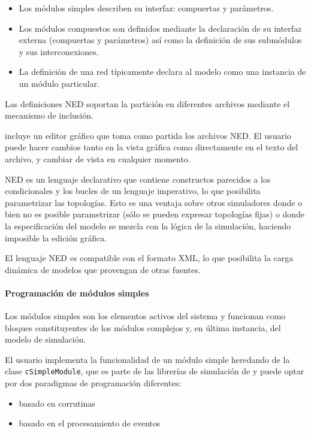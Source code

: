 \begin{itemize}
    \item Los módulos simples describen su interfaz: compuertas y parámetros.

    \item Los módulos compuestos son definidos mediante la declaración de su
interfaz externa (compuertas y parámetros) así como la definición de sus
submódulos y sus interconexiones.

    \item La definición de una red típicamente declara al modelo como una
instancia de un módulo particular.
\end{itemize}

Las definiciones NED soportan la partición en diferentes archivos mediante el
mecanismo de inclusión.

\omnetpp{} incluye un editor gráfico que toma como partida los archivos NED. El
usuario puede hacer cambios tanto en la vista gráfica como directamente en el
texto del archivo, y cambiar de vista en cualquier momento.

NED es un lenguaje declarativo que contiene constructos parecidos a los
condicionales y los bucles de un lenguaje imperativo, lo que posibilita
parametrizar las topologías. Esto es una ventaja sobre otros simuladores donde
o bien no es posible parametrizar (sólo se pueden expresar topologías fijas) o
donde la especificación del modelo se mezcla con la lógica de la simulación,
haciendo imposible la edición gráfica.

El lenguaje NED es compatible con el formato XML, lo que posibilita la carga
dinámica de modelos que provengan de otras fuentes.

\paragraph{Programación de módulos simples}

Los módulos simples son los elementos activos del sistema y funcionan como
bloques constituyentes de los módulos complejos y, en última instancia, del
modelo de simulación.

El usuario implementa la funcionalidad de un módulo simple heredando de la
clase \verb!cSimpleModule!, que es parte de las librerías de simulación de
\omnetpp{} y puede optar por dos paradigmas de programación diferentes:

\begin{itemize}
    \item basado en corrutinas
    \item basado en el procesamiento de eventos
\end{itemize}

